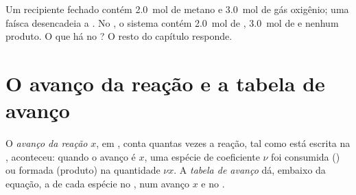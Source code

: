 \begin{example}\label{ex:g10:reaction-progress-table:methane}
Um recipiente fechado contém \qty{2.0}{mol} de metano e \qty{3.0}{mol} de
gás oxigênio; uma faísca desencadeia a 
. No , o sistema contém
\qty{2.0}{mol} de , \qty{3.0}{mol} de  e nenhum
produto. O que há no ? O resto do capítulo responde.
\end{example}

\section{O avanço da reação e a tabela de avanço}

\begin{definition}\label{def:g10:reaction-progress-table:extent}
O \emph{avanço da reação} $x$, em , conta
quantas vezes a reação, tal como está escrita na ,
aconteceu: quando o avanço é $x$, uma espécie de coeficiente $\nu$ foi
consumida () ou formada (produto) na quantidade $\nu x$. A
\emph{tabela de avanço} dá, embaixo da equação, a
 de cada espécie no , num avanço $x$
e no .
\end{definition}

